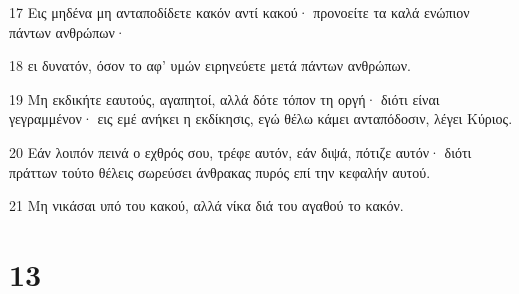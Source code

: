\par 17 Εις μηδένα μη ανταποδίδετε κακόν αντί κακού· προνοείτε τα καλά ενώπιον πάντων ανθρώπων·
\par 18 ει δυνατόν, όσον το αφ' υμών ειρηνεύετε μετά πάντων ανθρώπων.
\par 19 Μη εκδικήτε εαυτούς, αγαπητοί, αλλά δότε τόπον τη οργή· διότι είναι γεγραμμένον· εις εμέ ανήκει η εκδίκησις, εγώ θέλω κάμει ανταπόδοσιν, λέγει Κύριος.
\par 20 Εάν λοιπόν πεινά ο εχθρός σου, τρέφε αυτόν, εάν διψά, πότιζε αυτόν· διότι πράττων τούτο θέλεις σωρεύσει άνθρακας πυρός επί την κεφαλήν αυτού.
\par 21 Μη νικάσαι υπό του κακού, αλλά νίκα διά του αγαθού το κακόν.

\chapter{13}

